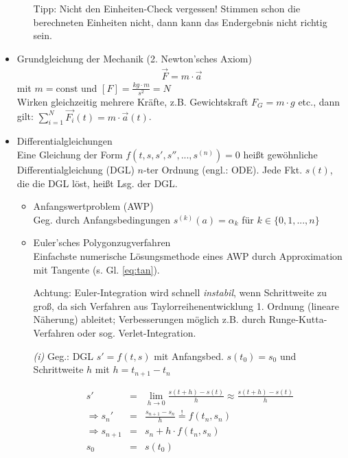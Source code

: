 \documentclass[a4paper, 12pt, onecolumn]{scrartcl}
\begin{document}
\begin{itemize}
\begin{itemize}
    Tipp: Nicht den Einheiten-Check vergessen! Stimmen schon die berechneten Einheiten
    nicht, dann kann das Endergebnis nicht richtig sein.
    \end{itemize}
    
    \item Grundgleichung der Mechanik (2. Newton'sches Axiom)\\
  \begin{align}
    \vec{F} = m \cdot \vec{a}
    \label{eq:fma}
  \end{align}
    mit $m = \text{const}$ und $[F] = \frac{kg \cdot m}{s^2} = N$\\
    Wirken gleichzeitig mehrere Kräfte, z.B. Gewichtskraft $F_G = m \cdot g$ etc.,
    dann gilt: $\sum_{i=1}^{N} \vec{F_i} (t) = m \cdot \vec{a} (t)$.
    
    \item Differentialgleichungen\\
    Eine Gleichung der Form $f(t, s, s', s'', ..., s^{(n)}) = 0$ heißt gewöhnliche 
    Differentialgleichung (DGL) $n$-ter Ordnung (engl.: ODE). Jede Fkt. $s (t)$, die 
    die DGL löst, heißt Lsg. der DGL.
    
    \begin{itemize}
        \item Anfangswertproblem (AWP)\\
        Geg. durch Anfangsbedingungen $s^{(k)} (a) = \alpha_k$ für $k \in \{0, 1, ..., n\}$
        
        \item Euler'sches Polygonzugverfahren\\
        Einfachste numerische Lösungsmethode eines AWP durch Approximation mit Tangente 
        (s. Gl. \ref{eq:tan}).
        
        Achtung: Euler-Integration wird schnell \emph{instabil}, wenn Schrittweite zu groß, da sich 
        Verfahren aus Taylorreihenentwicklung 1. Ordnung (lineare Näherung) ableitet;
        Verbesserungen möglich z.B. durch Runge-Kutta-Verfahren oder sog. Verlet-Integration.
        
        \emph{(i)} Geg.: DGL $s' = f (t, s)$ mit Anfangsbed. $s (t_0) = s_0$ und 
        Schrittweite $h$ mit $h = t_{n+1} - t_n$
        
        \begin{eqnarray}
                    s'      &=& \lim_{h \rightarrow 0} \frac{s (t + h) - s (t)}{h}
                                \approx \frac{s (t + h) - s (t)}{h} \\
        \Rightarrow s_n'    &=& \frac{s_{n+1} - s_n}{h} \stackrel{!} = f (t_n, s_n) \\
        \Rightarrow s_{n+1} &=& s_n + h \cdot f (t_n, s_n) \label{eq:tan} \\   %
                    s_0     &=& s (t_0)
        \end{eqnarray}
        

\end{itemize}
\end{itemize}
\end{document}

